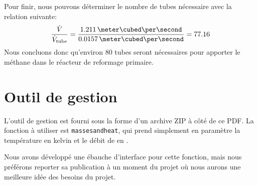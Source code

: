 \documentclass[a4paper,12pt]{article}
\begin{document}
Pour finir, nous pouvons déterminer
le nombre de tubes nécessaire avec la relation suivante:
\begin{equation*}
    \frac{\dot{V}}{\dot{V}\ind{tube}}
    = \frac{1.211\,\meter\cubed\per\second}{0.0157\,\meter\cubed\per\second} = 77.16
\end{equation*}
Nous concluons donc qu'environ 80 tubes seront nécessaires pour apporter le méthane
dans le réacteur de reformage primaire.

\section{Outil de gestion}

L'outil de gestion est fourni sous la forme d'un archive ZIP à côté de ce PDF.
La fonction à utiliser est \texttt{masses\textunderscore and\textunderscore heat},
qui prend simplement en paramètre la température en kelvin et le débit
de  en \kilogram\per\second.

Nous avons développé une ébauche d'interface pour cette fonction,
mais nous préférons reporter sa publication à un moment du projet où nous aurons
une meilleure idée des besoins du projet.

\printbibliography[heading=bibintoc]
\end{document}
